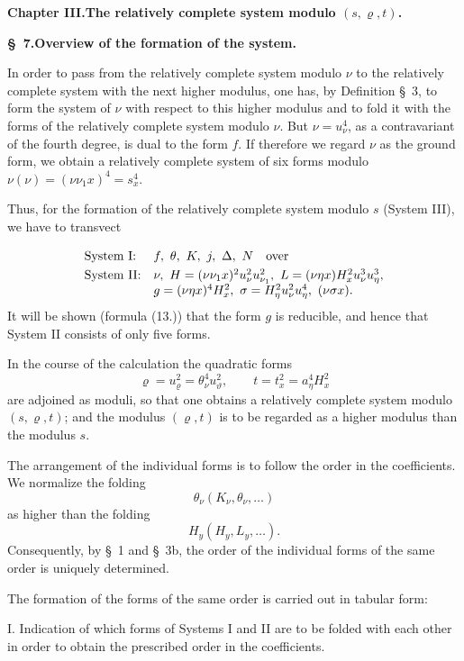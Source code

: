 \documentclass[11pt]{article}
\newcommand{\A}{\Delta}
\begin{document}
\begin{center}
{\Large\bfseries Chapter III.\quad The relatively complete system modulo $(s,\varrho,t)$.}
\end{center}

\begin{center}
\textbf{\S\ 7.\quad Overview of the formation of the system.}
\end{center}

In order to pass from the relatively complete system modulo $\nu$ to the relatively complete system with the next higher modulus, one has, by Definition \S\ 3, to form the system of $\nu$ with respect to this higher modulus and to fold it with the forms of the relatively complete system modulo $\nu$. But $\nu=u_\nu^4$, as a contravariant of the fourth degree, is dual to the form $f$. If therefore we regard $\nu$ as the ground form, we obtain a relatively complete system of six forms modulo $\nu(\nu)=(\nu\nu_1x)^4=s_x^4$.

Thus, for the formation of the relatively complete system modulo $s$ (System III), we have to transvect
\[
\begin{array}{ll}
\text{System I:} & f,\ \theta,\ K,\ j,\ \A,\ N\quad \text{over}\vphantom{\dfrac11}\\[0.3em]
\text{System II:} & \nu,\ H=(\nu\nu_1x)^2u_\nu^2u_{\nu_1}^2,\ L=(\nu\eta x)H_x^2u_\nu^3u_\eta^3,\\
& g=(\nu\eta x)^4H_x^2,\ \sigma=H_\eta^2u_\nu^2u_\eta^4,\ (\nu\sigma x).
\end{array}
\]
It will be shown (formula (13.)) that the form $g$ is reducible, and hence that System II consists of only five forms.

In the course of the calculation the quadratic forms
\[
\varrho=u_\varrho^2=\theta_\nu^4u_\vartheta^2,
\qquad
 t=t_x^2=a_\eta^4H_x^2
\]
are adjoined as moduli, so that one obtains a relatively complete system modulo $(s,\varrho,t)$; and the modulus $(\varrho,t)$ is to be regarded as a higher modulus than the modulus $s$.

The arrangement of the individual forms is to follow the order in the coefficients. We normalize the folding
\[
\theta_\nu(K_\nu,\theta_\nu,\ldots)
\]
as higher than the folding
\[
H_y(H_y,L_y,\ldots).
\]
Consequently, by \S\ 1 and \S\ 3b, the order of the individual forms of the same order is uniquely determined.

The formation of the forms of the same order is carried out in tabular form:

I. Indication of which forms of Systems I and II are to be folded with each other in order to obtain the prescribed order in the coefficients.
\end{document}
